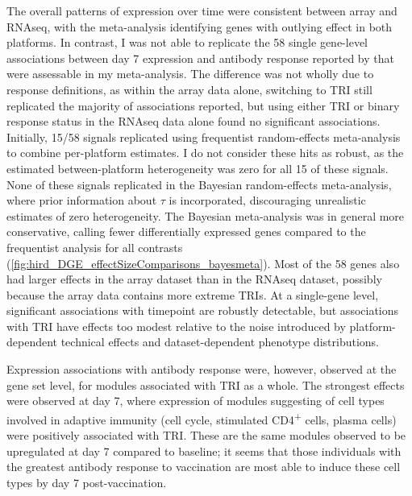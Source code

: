The overall patterns of expression over time were consistent between array and \gls{RNAseq}, with the meta-analysis identifying genes with outlying effect in both platforms.
In contrast, I was not able to replicate the 58 single gene-level associations between day 7 expression and antibody response reported by \textcite{sobolev2016AdjuvantedInfluenzaH1N1Vaccination} that were assessable in my meta-analysis.
The difference was not wholly due to response definitions, as within the array data alone, switching to \gls{TRI} still replicated the majority of associations reported,
but using either \gls{TRI} or binary response status in the \gls{RNAseq} data alone found no significant associations.
Initially, 15/58 signals replicated using frequentist random-effects meta-analysis to combine per-platform estimates.
I do not consider these hits as robust, as the estimated between-platform heterogeneity was zero for all 15 of these signals.
None of these signals replicated in the Bayesian random-effects meta-analysis,
where prior information about $\tau$ is incorporated, discouraging unrealistic estimates of zero heterogeneity.
The Bayesian meta-analysis was in general more conservative, calling fewer differentially expressed genes compared to the frequentist analysis for all contrasts (\cref{fig:hird_DGE_effectSizeComparisons_bayesmeta}).
Most of the 58 genes also had larger effects in the array dataset than in the \gls{RNAseq} dataset, possibly because the array data contains more extreme \glspl{TRI}.
At a single-gene level, significant associations with timepoint are robustly detectable, 
but associations with \gls{TRI} have effects too modest relative to the noise introduced by platform-dependent technical effects and dataset-dependent phenotype distributions.
%

Expression associations with antibody response were, however, observed at the gene set level, for modules associated with \gls{TRI} as a whole.
The strongest effects were observed at day 7, where expression of modules suggesting of cell types involved in adaptive immunity (cell cycle, stimulated CD4\textsuperscript{+} cells, plasma cells) were positively associated with \gls{TRI}.
These are the same modules observed to be upregulated at day 7 compared to baseline; it seems that those individuals with the greatest antibody response to vaccination are most able to induce these cell types by day 7 post-vaccination.

